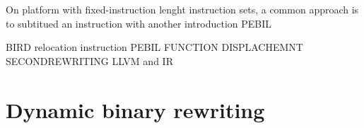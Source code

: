    
 On platform with fixed-instruction lenght instruction sets, a common approach is to subtitued an instruction with another introduction PEBIL 
 
 BIRD relocation instruction 
 PEBIL FUNCTION DISPLACHEMNT 
 SECONDREWRITING   LLVM and IR
 



\label{static_rewriting}

\section{Dynamic binary rewriting}
\label{dynamic_rewriting}



